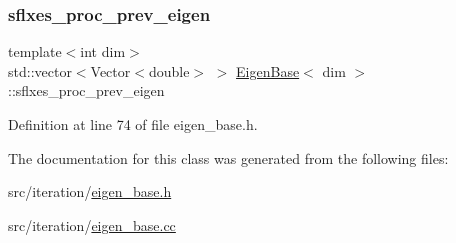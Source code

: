 \subsubsection{\texorpdfstring{sflxes\+\_\+proc\+\_\+prev\+\_\+eigen}{sflxes\_proc\_prev\_eigen}}
{\footnotesize\ttfamily template$<$int dim$>$ \\
std\+::vector$<$Vector$<$double$>$ $>$ \hyperlink{class_eigen_base}{Eigen\+Base}$<$ dim $>$\+::sflxes\+\_\+proc\+\_\+prev\+\_\+eigen\hspace{0.3cm}{\ttfamily [protected]}}



Definition at line 74 of file eigen\+\_\+base.\+h.



The documentation for this class was generated from the following files\+:\begin{DoxyCompactItemize}
\item 
src/iteration/\hyperlink{eigen__base_8h}{eigen\+\_\+base.\+h}\item 
src/iteration/\hyperlink{eigen__base_8cc}{eigen\+\_\+base.\+cc}\end{DoxyCompactItemize}
